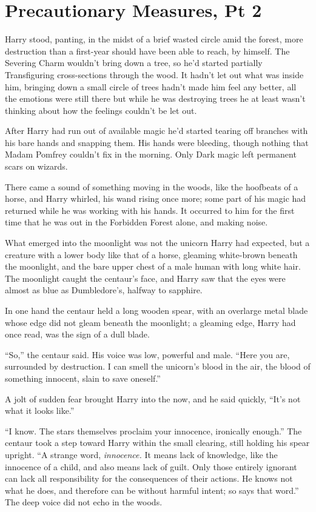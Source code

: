 \chapter{Precautionary Measures, Pt 2}

Harry stood, panting, in the midst of a brief wasted circle amid the
forest, more destruction than a first-year should have been able to
reach, by himself. The Severing Charm wouldn't bring down a tree, so
he'd started partially Transfiguring cross-sections through the wood. It
hadn't let out what was inside him, bringing down a small circle of
trees hadn't made him feel any better, all the emotions were still there
but while he was destroying trees he at least wasn't thinking about how
the feelings couldn't be let out.

After Harry had run out of available magic he'd started tearing off
branches with his bare hands and snapping them. His hands were bleeding,
though nothing that Madam Pomfrey couldn't fix in the morning. Only Dark
magic left permanent scars on wizards.

There came a sound of something moving in the woods, like the hoofbeats
of a horse, and Harry whirled, his wand rising once more; some part of
his magic had returned while he was working with his hands. It occurred
to him for the first time that he was out in the Forbidden Forest alone,
and making noise.

What emerged into the moonlight was not the unicorn Harry had expected,
but a creature with a lower body like that of a horse, gleaming
white-brown beneath the moonlight, and the bare upper chest of a male
human with long white hair. The moonlight caught the centaur's face, and
Harry saw that the eyes were almost as blue as Dumbledore's, halfway to
sapphire.

In one hand the centaur held a long wooden spear, with an overlarge
metal blade whose edge did not gleam beneath the moonlight; a gleaming
edge, Harry had once read, was the sign of a dull blade.

``So,'' the centaur said. His voice was low, powerful and male. ``Here
you are, surrounded by destruction. I can smell the unicorn's blood in
the air, the blood of something innocent, slain to save oneself.''

A jolt of sudden fear brought Harry into the now, and he said quickly,
``It's not what it looks like.''

``I know. The stars themselves proclaim your innocence, ironically
enough.'' The centaur took a step toward Harry within the small
clearing, still holding his spear upright. ``A strange word,
\emph{innocence.} It means lack of knowledge, like the innocence of a
child, and also means lack of guilt. Only those entirely ignorant can
lack all responsibility for the consequences of their actions. He knows
not what he does, and therefore can be without harmful intent; so says
that word.'' The deep voice did not echo in the woods.

